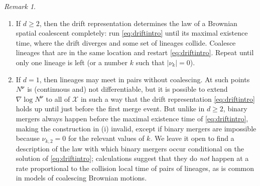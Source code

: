 \documentclass[reqno,draft]{amsart}
\numberwithin{equation}{section}
\theoremstyle{plain}
\theoremstyle{remark}
\newtheorem{remark}[theorem]{Remark}
\newcommand{\N}{\mathbb{N}} %
\newcommand{\nut}[1]{|\nu_{#1}|}
\begin{document}
\begin{remark}\label{rem:driftintro}
    \begin{enumerate}
        \item If $d \ge 2$, %
            then the drift representation determines the law of a Brownian spatial coalescent completely: run \cref{eq:driftintro} until its maximal existence time, where the drift diverges and some set of lineages collide. Coalesce lineages that are in the same location and restart \cref{eq:driftintro}. %
            Repeat until only one lineage is left (or a number $k$ such that $\nut{k} = 0$).
        \item If $d = 1$, then lineages may meet in pairs without coalescing. At such points $N^{\boldsymbol \nu}$ is (continuous and) not differentiable, but it is possible to extend $\nabla \log N^{\boldsymbol \nu}$ to all of $\mathcal{X}$ in such a way that the drift representation \cref{eq:driftintro} holds up until just before the first merge event. But unlike in $d\ge 2$, binary mergers always happen before the maximal existence time of \cref{eq:driftintro}, making the construction in (i) invalid, except if binary mergers are impossible because $\nu_{k,2} = 0$ for the relevant values of $k$. %
            We leave it open to find a description of the law with which binary mergers occur conditional on the solution of \cref{eq:driftintro}; calculations suggest that they do \emph{not} happen at a rate proportional to the collision local time of pairs of lineages, as is common in models of coalescing Brownian motions.

    \end{enumerate}
\end{remark}
\end{document}
